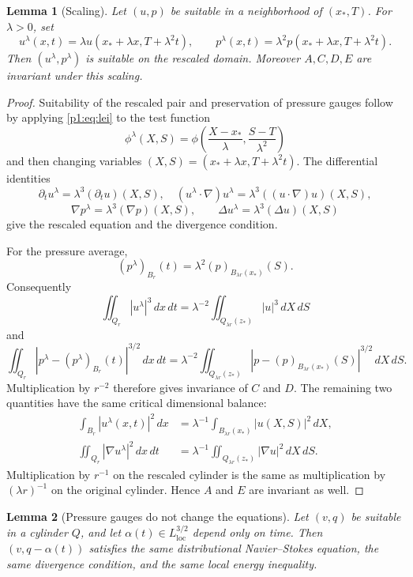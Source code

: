 \documentclass[11pt]{amsart}
\theoremstyle{plain}
\newtheorem{lemma}[lemma]{Lemma}
\theoremstyle{definition}
\theoremstyle{remark}
\numberwithin{equation}{section}
\newcommand{\loc}{\mathrm{loc}}
\begin{document}
\begin{lemma}[Scaling]\label{p1:lem:scaling}
Let \((u,p)\) be suitable in a neighborhood of \((x_*,T)\).  For
\(\lambda>0\), set
\[
   u^\lambda(x,t)=\lambda u(x_*+\lambda x,T+\lambda^2t),
   \qquad
   p^\lambda(x,t)=\lambda^2p(x_*+\lambda x,T+\lambda^2t).
\]
Then \((u^\lambda,p^\lambda)\) is suitable on the rescaled domain.  Moreover
\(A,C,D,E\) are invariant under this scaling.
\end{lemma}

\begin{proof}
Suitability of the rescaled pair and preservation of pressure gauges follow
by applying \eqref{p1:eq:lei} to the test function
\[
   \phi^\lambda(X,S)
   =
   \phi\left(\frac{X-x_*}{\lambda},\frac{S-T}{\lambda^2}\right)
\]
and then changing variables
\((X,S)=(x_*+\lambda x,T+\lambda^2t)\).  The differential identities
\[
   \partial_tu^\lambda=\lambda^3(\partial_tu)(X,S),\quad
   (u^\lambda\cdot\nabla)u^\lambda
      =\lambda^3((u\cdot\nabla)u)(X,S),
\]
\[
   \nabla p^\lambda=\lambda^3(\nabla p)(X,S),\qquad
   \Delta u^\lambda=\lambda^3(\Delta u)(X,S)
\]
give the rescaled equation and the divergence condition.

For the pressure average,
\[
   (p^\lambda)_{B_r}(t)
   =
   \lambda^2(p)_{B_{\lambda r}(x_*)}(S).
\]
Consequently
\[
   \iint_{Q_r}|u^\lambda|^3\,dx\,dt
   =
   \lambda^{-2}\iint_{Q_{\lambda r}(z_*)}|u|^3\,dX\,dS
\]
and
\[
   \iint_{Q_r}|p^\lambda-(p^\lambda)_{B_r}(t)|^{3/2}\,dx\,dt
   =
   \lambda^{-2}
   \iint_{Q_{\lambda r}(z_*)}
   |p-(p)_{B_{\lambda r}(x_*)}(S)|^{3/2}\,dX\,dS .
\]
Multiplication by \(r^{-2}\) therefore gives invariance of \(C\) and \(D\).
The remaining two quantities have the same critical dimensional balance:
\begin{align*}
   \int_{B_r}|u^\lambda(x,t)|^2\,dx
   &=
   \lambda^{-1}\int_{B_{\lambda r}(x_*)}|u(X,S)|^2\,dX,\\
   \iint_{Q_r}|\nabla u^\lambda|^2\,dx\,dt
   &=
   \lambda^{-1}\iint_{Q_{\lambda r}(z_*)}|\nabla u|^2\,dX\,dS .
\end{align*}
Multiplication by \(r^{-1}\) on the rescaled cylinder is the same as
multiplication by \((\lambda r)^{-1}\) on the original cylinder.  Hence
\(A\) and \(E\) are invariant as well.
\end{proof}

\begin{lemma}[Pressure gauges do not change the equations]
\label{p1:lem:gauges}
Let \((v,q)\) be suitable in a cylinder \(Q\), and let
\(\alpha(t)\in L^{3/2}_{\loc}\) depend only on time.  Then
\((v,q-\alpha(t))\) satisfies the same distributional Navier--Stokes equation,
the same divergence condition, and the same local energy inequality.
\end{lemma}
\end{document}
